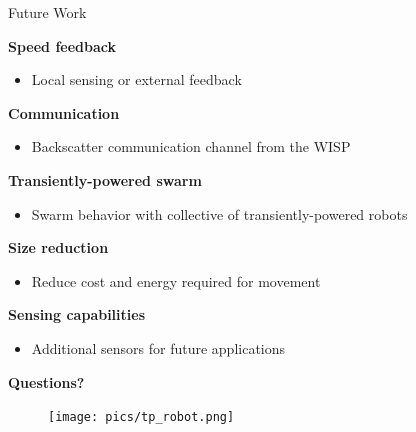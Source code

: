 \documentclass{beamer}
\begin{document}
\begin{frame}{Future Work}

	\textbf{Speed feedback} \\
	\begin{itemize}
		\item Local sensing or external feedback
	\end{itemize}
	\textbf{Communication} \\
	\begin{itemize}
		\item Backscatter communication channel from the WISP
	\end{itemize}
	\textbf{Transiently-powered swarm} \\
	\begin{itemize}
		\item Swarm behavior with collective of transiently-powered robots
	\end{itemize}
	\textbf{Size reduction} \\
	\begin{itemize}
		\item Reduce cost and energy required for movement
	\end{itemize}
	\textbf{Sensing capabilities} \\
	\begin{itemize}
		\item Additional sensors for future applications
	\end{itemize}
	
\end{frame}

\begin{frame}{}
	\begin{center}
		\textbf{\huge{Questions?}}
		\vspace{2em}
		\begin{figure}
			\texttt{[image: pics/tp\_robot.png]}
		\end{figure}
	\end{center}
\end{frame}
\end{document}
